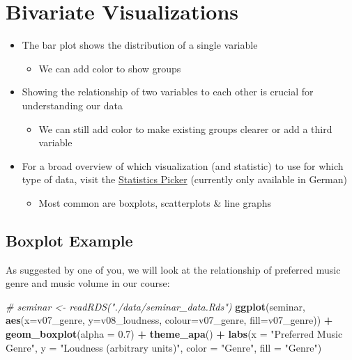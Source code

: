 \documentclass[
]{book}
\newenvironment{Shaded}{\begin{snugshade}}{\end{snugshade}}
\newcommand{\AttributeTok}[1]{\textcolor[rgb]{0.13,0.29,0.53}{#1}}
\newcommand{\CommentTok}[1]{\textcolor[rgb]{0.56,0.35,0.01}{\textit{#1}}}
\newcommand{\FloatTok}[1]{\textcolor[rgb]{0.00,0.00,0.81}{#1}}
\newcommand{\FunctionTok}[1]{\textcolor[rgb]{0.13,0.29,0.53}{\textbf{#1}}}
\newcommand{\NormalTok}[1]{#1}
\newcommand{\SpecialCharTok}[1]{\textcolor[rgb]{0.81,0.36,0.00}{\textbf{#1}}}
\newcommand{\StringTok}[1]{\textcolor[rgb]{0.31,0.60,0.02}{#1}}
\providecommand{\tightlist}{%
  \setlength{\itemsep}{0pt}\setlength{\parskip}{0pt}}
\begin{document}
\section{Bivariate Visualizations}\label{bivariate-visualizations}

\begin{itemize}
\tightlist
\item
  The bar plot shows the distribution of a single variable

  \begin{itemize}
  \tightlist
  \item
    We can add color to show groups
  \end{itemize}
\item
  Showing the relationship of two variables to each other is crucial for understanding our data

  \begin{itemize}
  \tightlist
  \item
    We can still add color to make existing groups clearer or add a third variable
  \end{itemize}
\item
  For a broad overview of which visualization (and statistic) to use for which type of data, visit the \href{https://the-tave.shinyapps.io/Statistik-Picker/}{Statistics Picker} (currently only available in German)

  \begin{itemize}
  \tightlist
  \item
    Most common are boxplots, scatterplots \& line graphs
  \end{itemize}
\end{itemize}

\subsection{Boxplot Example}\label{boxplot-example}

As suggested by one of you, we will look at the relationship of preferred music genre and music volume in our course:

\begin{Shaded}
\begin{Highlighting}[]
\CommentTok{\# seminar \textless{}{-} readRDS("./data/seminar\_data.Rds")}
\FunctionTok{ggplot}\NormalTok{(seminar, }\FunctionTok{aes}\NormalTok{(}\AttributeTok{x=}\NormalTok{v07\_genre, }\AttributeTok{y=}\NormalTok{v08\_loudness, }\AttributeTok{colour=}\NormalTok{v07\_genre, }\AttributeTok{fill=}\NormalTok{v07\_genre)) }\SpecialCharTok{+}
  \FunctionTok{geom\_boxplot}\NormalTok{(}\AttributeTok{alpha =} \FloatTok{0.7}\NormalTok{) }\SpecialCharTok{+} \FunctionTok{theme\_apa}\NormalTok{() }\SpecialCharTok{+}
  \FunctionTok{labs}\NormalTok{(}\AttributeTok{x =} \StringTok{"Preferred Music Genre"}\NormalTok{, }\AttributeTok{y =} \StringTok{"Loudness (arbitrary units)"}\NormalTok{, }
       \AttributeTok{color =} \StringTok{"Genre"}\NormalTok{, }\AttributeTok{fill =} \StringTok{"Genre"}\NormalTok{)}
\end{Highlighting}
\end{Shaded}
\end{document}
